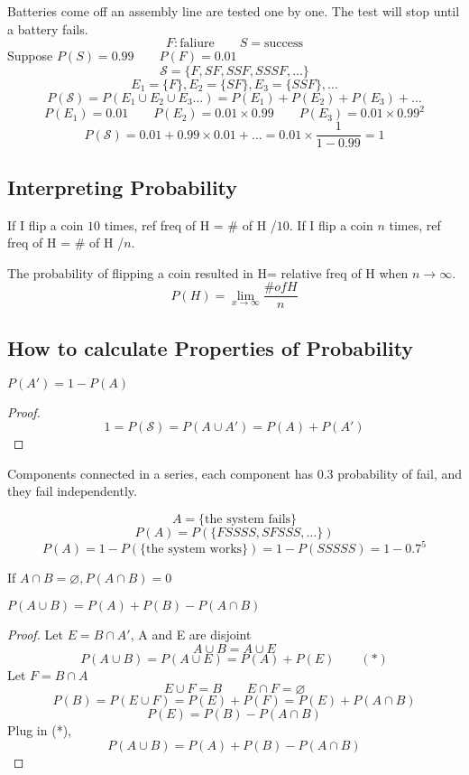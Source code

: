 \begin{exmp}
Batteries come off an assembly line are tested one by one. The test will stop until a battery fails.
\[F:\text{faliure} \qquad S=\text{success}\]
Suppose $P(S)=0.99 \qquad P(F)=0.01$
\[\mathcal{S}=\{ F,SF,SSF,SSSF,\dots		\}\]
\[E_1=\{F\},E_2=\{SF\},E_3=\{SSF\},\dots		\]
\[P(\mathcal{S})=P(E_1 \cup E_2 \cup E_3 \dots)=P(E_1)+P(E_2)+P(E_3)+\dots\]
\[P(E_1)=0.01 \qquad P(E_2)=0.01\times0.99 \qquad P(E_3)=0.01\times 0.99^2\]
\[P(\mathcal{S})=0.01+0.99\times0.01+\dots=0.01\times\frac{1}{1-0.99}=1\]
\end{exmp}

\subsection{Interpreting Probability}
\begin{exmp}
If I flip a coin $10$ times, ref freq of H = \# of H /$10$. If I flip a coin $n$ times, ref freq of H = \# of H /$n$.

The probability of flipping a coin resulted in H= relative freq of H when $n\to \infty$. 
\[P(H)=\lim _{x \to \infty} \frac{\# of H}{n}\]
\end{exmp}

\subsection{How to calculate Properties of Probability}

\begin{prop}
$P(A')=1 -P(A) $
\begin{proof}
\[1=P(\mathcal{S})=P(A \cup A')=P(A)+P(A')\]
\end{proof}
\end{prop}
  
\begin{exmp}
Components connected in a series, each component has 0.3 probability of fail, and they fail independently.
   
\[A=\{\text{the system fails}\}\]
\[P(A)=P(\{ FSSSS,SFSSS,\dots\})\]
\[P(A)=1-P(\{\text{the system works}\})=1-P(SSSSS)=1-0.7^5\]
\end{exmp}
  
\begin{prop}
  If $A\cap B =\varnothing, P(A \cap B)=0 $
\end{prop}
  
\begin{prop}
 $ P(A \cup B)= P(A) +P(B) -P(A \cap B) $
\begin{proof}
Let $E = B \cap A' $, A and E are disjoint
  \[A \cup B = A \cup E\]
  \[P(A\cup B)=P(A \cup E)=P(A)+P(E)  \qquad (*)\]
Let $F= B\cap A$
  \[E \cup F =B \qquad E \cap F =\varnothing\]
  \[ P(B) = P(E \cup F)=P(E) + P(F)=P(E)+P(A\cap B)  \]
  \[P(E)= P(B)- P(A \cap B) \]
Plug in (*),\[  P(A \cup B)= P(A) +P(B) -P(A \cap B)  \]
\end{proof}
\end{prop}


